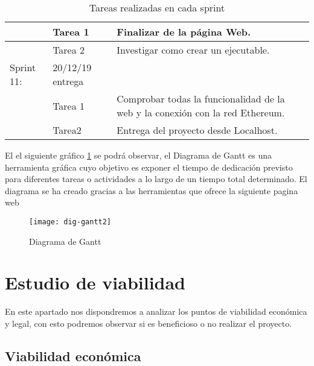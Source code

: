 \begin{table}[H]
\begin{tabular}{|p{1.5cm}|p{1.5cm}|p{5cm}}
                         & Tarea 1                       & \multicolumn{1}{p{9.2cm}|}{Finalizar de la página Web.}                                                                  \\ \hline
                         & Tarea 2                       & \multicolumn{1}{p{9.2cm}|}{Investigar como crear un ejecutable.}                                                         \\ \hline
Sprint 11:               & 20/12/19  entrega  & \multicolumn{1}{l|}{}                                                                                             \\ \hline
                         & Tarea 1                       & \multicolumn{1}{p{9.2cm}|}{Comprobar todas la funcionalidad de la web y la conexión con la red Ethereum.}                \\ \hline
                         & Tarea2                        & \multicolumn{1}{p{9.2cm}|}{Entrega del proyecto desde Localhost.}                                                        \\ \hline
\end{tabular}
\caption{Tareas realizadas en cada sprint}
\label{tabla:sprint1}
\end{table}

El el siguiente gráfico \ref{ref:gantt} se podrá observar, el Diagrama de Gantt \cite{gantt} es una herramienta gráfica cuyo objetivo es exponer el tiempo de dedicación previsto para diferentes tareas o actividades a lo largo de un tiempo total determinado. El diagrama se ha creado gracias a las herramientas que ofrece la siguiente pagina web \cite{ganttGrafico}

\begin{figure}[H]
    \centering
    \texttt{[image: dig-gantt2]}
    \caption{Diagrama de Gantt}
    \label{ref:gantt}
\end{figure}

\section{Estudio de viabilidad}

En este apartado nos dispondremos a analizar los puntos de  viabilidad económica y legal, con esto podremos observar si es beneficioso o no realizar el proyecto.

\subsection{Viabilidad económica}

